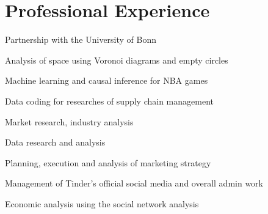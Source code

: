 
\section{Professional Experience}

\begin{tightemize}
    \item Partnership with the University of Bonn
\end{tightemize}
\sectionsep

\begin{tightemize}
    \item Analysis of space using Voronoi diagrams and empty circles
\end{tightemize}
\sectionsep

  
\begin{tightemize}
\item Machine learning and causal inference for NBA games
\item Data coding for researches of supply chain management
    \end{tightemize}
\sectionsep

\begin{tightemize}
\item Market research, industry analysis
\item Data research and analysis
\item Planning, execution and analysis of marketing strategy
\item Management of Tinder's official social media and overall admin work
\end{tightemize}
\sectionsep

\begin{tightemize}
\item Economic analysis using the social network analysis
\end{tightemize}
\sectionsep

